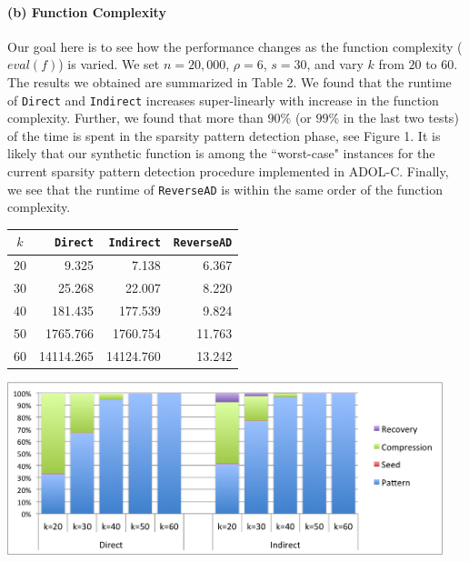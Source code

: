 \documentclass[11pt, a4paper, english]{article}
\begin{document}
\paragraph{(b) Function Complexity} 
Our goal here is to see how the performance changes as the function complexity ($eval(f)$) 
is varied. We set $n = 20,000$, $\rho = 6$, $s = 30$, and vary $k$ from $20$ to $60$. 
The results we obtained are summarized in Table 2.
We found that the runtime of {\tt Direct} and {\tt Indirect} increases super-linearly with increase in the function complexity. Further, we found that more than $90\%$ (or $99\%$ in the last two tests) of the time is spent in the sparsity pattern detection phase, see Figure 1. It is likely that our synthetic function is among the ``worst-case" instances for the current sparsity pattern detection procedure implemented in ADOL-C.  Finally, we see that the runtime of {\tt ReverseAD} is within the same order of the function complexity.
\begin{minipage}{\textwidth}
  \begin{minipage}[b]{0.45\textwidth}
    \centering
\begin{tabular}{|c|r|r|r|}
\hline
$k$ & {\tt Direct} & {\tt Indirect} & {\tt ReverseAD} \\
\hline
20 & 9.325 & 7.138 & 6.367 \\
30 & 25.268 & 22.007 & 8.220\\
40 & 181.435 & 177.539 & 9.824\\
50 & 1765.766 & 1760.754 & 11.763 \\
60 & 14114.265 & 14124.760 & 13.242\\
\hline
\end{tabular}
\end{minipage}
\begin{minipage}[b]{0.06\textwidth}
\phantom{b}
\end{minipage}
  \begin{minipage}[b]{0.45\textwidth}
    \centering
    \includegraphics[width=0.95\textwidth]{figures/pb}
  \end{minipage}
  \hfill
\end{minipage}
\end{document}
